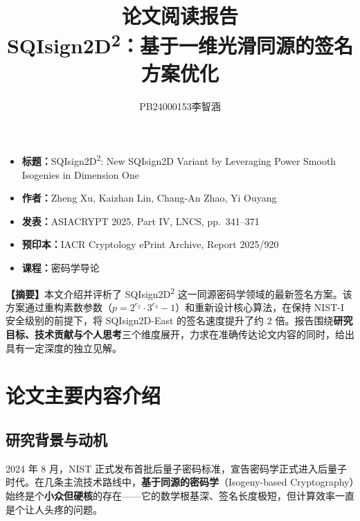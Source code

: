 \documentclass[12pt,a4paper]{ctexart}
\title{\vspace{-1em}\textbf{\LARGE 论文阅读报告}\\[0.4em]
\large SQIsign2D\textsuperscript{2}：基于一维光滑同源的签名方案优化}
\author{PB24000153\quad 李智涵}
\date{}
\begin{document}
\maketitle
\thispagestyle{empty}

\begin{infobox}[论文信息]
\begin{itemize}[leftmargin=1.5em,topsep=2pt]
    \item \textbf{标题：}SQIsign2D\textsuperscript{2}: New SQIsign2D Variant by Leveraging Power Smooth Isogenies in Dimension One
    \item \textbf{作者：}Zheng Xu, Kaizhan Lin, Chang-An Zhao, Yi Ouyang
    \item \textbf{发表：}ASIACRYPT 2025, Part IV, LNCS, pp.~341--371
    \item \textbf{预印本：}IACR Cryptology ePrint Archive, Report 2025/920
    \item \textbf{课程：}密码学导论
\end{itemize}
\end{infobox}

\vspace{0.5em}
\begin{tcolorbox}[enhanced,colback=mainblue!3,colframe=mainblue!20,arc=2pt,boxrule=0.4pt,left=8pt,right=8pt,top=6pt,bottom=6pt]
\textbf{【摘要】}本文介绍并评析了 SQIsign2D\textsuperscript{2} 这一同源密码学领域的最新签名方案。该方案通过重构素数参数（$p = 2^{e_2} \cdot 3^{e_3} - 1$）和重新设计核心算法，在保持 NIST-I 安全级别的前提下，将 SQIsign2D-East 的签名速度提升了约 2 倍。报告围绕\textbf{研究目标、技术贡献与个人思考}三个维度展开，力求在准确传达论文内容的同时，给出具有一定深度的独立见解。
\end{tcolorbox}

\section{论文主要内容介绍}

\subsection{研究背景与动机}

2024 年 8 月，NIST 正式发布首批后量子密码标准，宣告密码学正式进入后量子时代。在几条主流技术路线中，\textbf{基于同源的密码学}（Isogeny-based Cryptography）始终是个\textbf{小众但硬核}的存在——它的数学根基深、签名长度极短，但计算效率一直是个让人头疼的问题。
\end{document}
